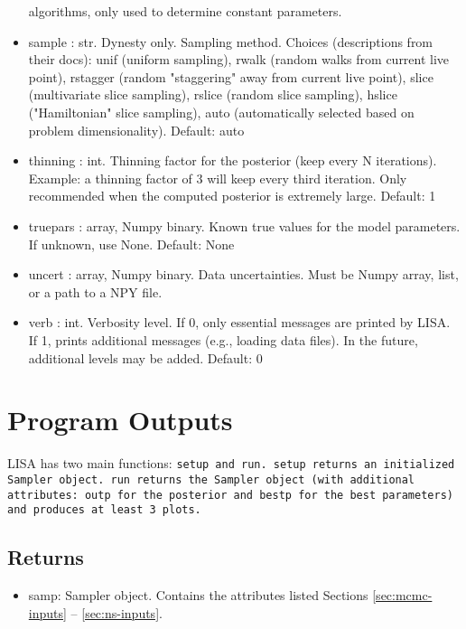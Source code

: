 \documentclass[letterpaper, 12pt]{article}
\begin{document}
\begin{itemize}
                         algorithms, only used to determine constant  
                         parameters.
\item sample : str. Dynesty only. Sampling method. Choices  
                        (descriptions from their docs): unif (uniform  
                        sampling), rwalk (random walks from current live  
                        point), rstagger (random "staggering" away from  
                        current live point), slice (multivariate slice  
                        sampling), rslice (random slice sampling), hslice  
                        ("Hamiltonian" slice sampling), auto  
                        (automatically selected based on problem  
                        dimensionality).  Default: auto
\item thinning : int. Thinning factor for the posterior  
                      (keep every N iterations).  
                      Example: a thinning factor of 3 will keep every  
                      third iteration.  Only recommended when the  
                      computed posterior is extremely large.   
                      Default: 1
\item truepars : array, Numpy binary. Known true values for the model  
                          parameters.  If unknown, use None.  Default: None
\item uncert : array, Numpy binary. Data uncertainties. 
                        Must be Numpy array, list, or a path to a NPY file.
\item verb : int. Verbosity level.  If 0, only essential messages 
                       are printed by LISA.  If 1, prints additional 
                       messages (e.g., loading data files).  
                       In the future, additional levels may be added.  
                       Default: 0
\end{itemize}


\section{Program Outputs}
\label{sec:outputs}

LISA has two main functions: \tt{setup} and \tt{run}.  \tt{setup} returns 
an initialized Sampler object.  \tt{run} returns the Sampler object (with 
additional attributes: outp for the posterior and bestp for the best parameters) and produces at least 3 plots.

\subsection{Returns}
\begin{itemize}
\item samp: Sampler object. Contains the attributes listed Sections 
\ref{sec:mcmc-inputs} -- \ref{sec:ns-inputs}.
\end{itemize}
\end{document}
